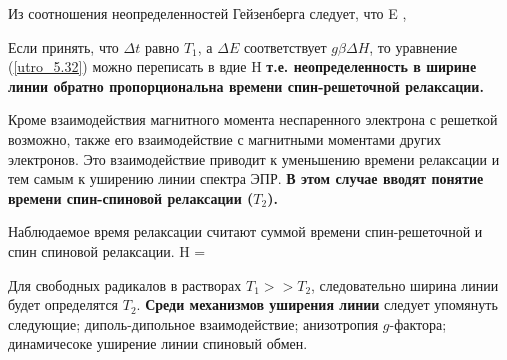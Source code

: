 \documentclass{beamer}
\begin{document}
\begin{frame}
\scriptsize{
Из соотношения неопределенностей Гейзенберга следует, что
\beq \label{utro_5.32}
\Delta E \geqslant {} \times {},
\eeq

Если принять, что $\Delta t$ равно $T_{1}$, а $\Delta E$ соответствует $g\beta \Delta H$, то уравнение (\ref{utro_5.32}) можно переписать в вдие
\beq \label{utro_5.33}
\Delta H \geqslant {} \times {}
\eeq
\textbf{т.е. неопределенность в ширине линии обратно пропорциональна времени спин-решеточной релаксации.}

Кроме взаимодействия магнитного момента неспаренного электрона с решеткой возможно, также его взаимодействие с магнитными моментами других электронов. Это взаимодействие приводит к уменьшению времени релаксации и тем самым к уширению линии спектра ЭПР. \textbf{В этом случае вводят понятие времени спин-спиновой релаксации ($T_{2}$).}

Наблюдаемое время релаксации считают суммой времени спин-решеточной и спин спиновой релаксации.
\beqn
\Delta H \geqslant {} \times {} =  \times {}
\eeq

Для свободных радикалов в растворах $T_{1} >> T_{2}$, следовательно ширина линии будет определятся $T_{2}$. \textbf{Среди механизмов уширения линии} следует упомянуть следующие; диполь-дипольное взаимодействие; анизотропия $g$-фактора; динамичесоке уширение линии спиновый обмен.
}
\end{frame}
\end{document}
